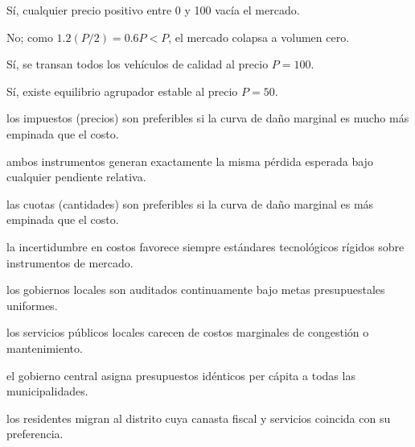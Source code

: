 \begin{opts}
    \item Sí, cualquier precio positivo entre 0 y 100 vacía el mercado.
    \item No; como $1.2(P/2) = 0.6 P < P$, el mercado colapsa a volumen cero.
    \item Sí, se transan todos los vehículos de calidad al precio $P = 100$.
    \item Sí, existe equilibrio agrupador estable al precio $P = 50$.
\end{opts}

\begin{opts}
    \item los impuestos (precios) son preferibles si la curva de daño marginal es mucho más empinada que el costo.
    \item ambos instrumentos generan exactamente la misma pérdida esperada bajo cualquier pendiente relativa.
    \item las cuotas (cantidades) son preferibles si la curva de daño marginal es más empinada que el costo.
    \item la incertidumbre en costos favorece siempre estándares tecnológicos rígidos sobre instrumentos de mercado.
\end{opts}

\begin{opts}
    \item los gobiernos locales son auditados continuamente bajo metas presupuestales uniformes.
    \item los servicios públicos locales carecen de costos marginales de congestión o mantenimiento.
    \item el gobierno central asigna presupuestos idénticos per cápita a todas las municipalidades.
    \item los residentes migran al distrito cuya canasta fiscal y servicios coincida con su preferencia.
\end{opts}

